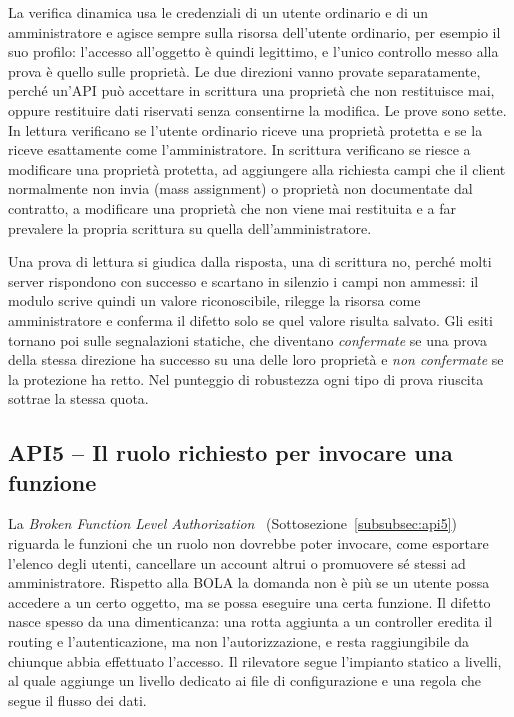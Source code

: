 La verifica dinamica usa le credenziali di un utente ordinario e di un
amministratore e agisce sempre sulla risorsa dell'utente ordinario, per esempio
il suo profilo: l'accesso all'oggetto è quindi legittimo, e l'unico controllo
messo alla prova è quello sulle proprietà. Le due direzioni vanno provate
separatamente, perché un'API può accettare in scrittura una proprietà che non
restituisce mai, oppure restituire dati riservati senza consentirne la
modifica. Le prove sono sette. In lettura
verificano se l'utente ordinario riceve una proprietà protetta e se la riceve
esattamente come l'amministratore. In scrittura verificano se riesce a
modificare una proprietà protetta, ad aggiungere alla richiesta campi che il
client normalmente non invia (mass assignment) o proprietà non documentate dal
contratto, a modificare una proprietà che non viene mai restituita e a far
prevalere la propria scrittura su quella dell'amministratore.

Una prova di lettura si giudica dalla risposta, una di scrittura no, perché
molti server rispondono con successo e scartano in silenzio i campi non
ammessi: il modulo scrive quindi un valore riconoscibile, rilegge la risorsa
come amministratore e conferma il difetto solo se quel valore risulta salvato.
Gli esiti tornano poi sulle segnalazioni statiche, che diventano
\emph{confermate} se una prova della stessa direzione ha successo su una delle
loro proprietà e \emph{non confermate} se la protezione ha retto. Nel
punteggio di robustezza ogni tipo di prova riuscita sottrae la stessa quota.

\subsection{API5 -- Il ruolo richiesto per invocare una funzione}
\label{sec:rilevamento-bfla}

La \emph{Broken Function Level Authorization}~\cite{owasp2023api5}
(Sottosezione~\ref{subsubsec:api5}) riguarda le funzioni che un ruolo non
dovrebbe poter invocare, come esportare l'elenco degli utenti, cancellare un
account altrui o promuovere sé stessi ad amministratore. Rispetto alla BOLA la
domanda non è più se un utente possa accedere a un certo oggetto, ma se possa
eseguire una certa funzione. Il difetto nasce spesso da una dimenticanza: una
rotta aggiunta a un controller eredita il routing e l'autenticazione, ma non
l'autorizzazione, e resta raggiungibile da chiunque abbia effettuato l'accesso.
Il rilevatore segue l'impianto statico a livelli, al quale aggiunge un livello
dedicato ai file di configurazione e una regola che segue il flusso dei dati.

